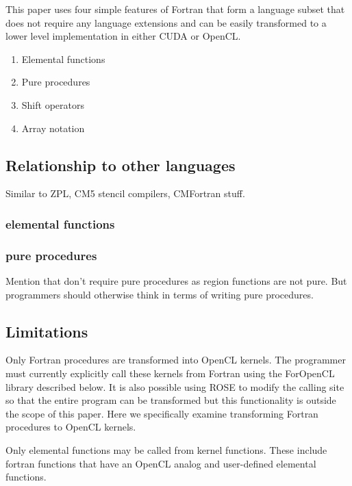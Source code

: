 \documentclass[10pt, conference, compsocconf]{IEEEtran}
\begin{document}
This paper uses four simple features of Fortran that form a language subset
that does not require any language extensions and can be easily transformed
to a lower level implementation in either CUDA or OpenCL.

\begin{enumerate}
\item Elemental functions
\item Pure procedures
\item Shift operators
\item Array notation
\end{enumerate}

\subsection{Relationship to other languages}

Similar to ZPL, CM5 stencil compilers, CMFortran stuff.


%
% 

\subsubsection{elemental functions}

\subsubsection{pure procedures}

Mention that don't require pure procedures as region functions are not pure.
But programmers should otherwise think in terms of writing pure procedures.

\subsection{Limitations}

Only Fortran procedures are transformed into OpenCL kernels.  The programmer
must currently explicitly call these kernels from Fortran using the ForOpenCL
library described below.  It is also possible using ROSE to modify the calling
site so that the entire program can be transformed but this functionality is
outside the scope of this paper.  Here we specifically examine transforming
Fortran procedures to OpenCL kernels.

Only elemental functions may be called from kernel functions.  These include
fortran functions that have an OpenCL analog and user-defined elemental functions.
\end{document}
